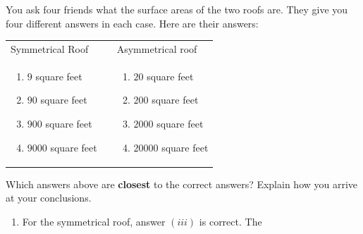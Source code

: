 \documentclass[handout,nooutcomes,noauthor,hints]{ximera}
\begin{document}
\begin{question}
\begin{center}
    \qquad
  \end{center}
  You ask four friends what the surface areas of the two roofs
  are. They give you four different answers in each case. Here are
  their answers:
  \begin{center}
    \begin{tabular}{lll}
      Symmetrical Roof &\hspace{1in} & Asymmetrical roof\\
    \begin{minipage}{2in}\begin{enumerate}
    \item $9$ square feet
    \item $90$ square feet
    \item $900$ square feet
    \item $9000$ square feet
    \end{enumerate} 
    \end{minipage}
    & &
    \begin{minipage}{2in} \begin{enumerate}
    \item $20$ square feet
    \item $200$ square feet
    \item $2000$ square feet
    \item $20000$ square feet
      \end{enumerate}
    \end{minipage}
    \end{tabular}
  \end{center}
  Which answers above are \textbf{closest} to the correct answers?
  Explain how you arrive at your conclusions.
  \begin{freeResponse}
    \begin{enumerate}
    \item For the symmetrical roof, answer $(iii)$ is correct. The

\end{enumerate}
\end{freeResponse}
\end{question}
\end{document}

